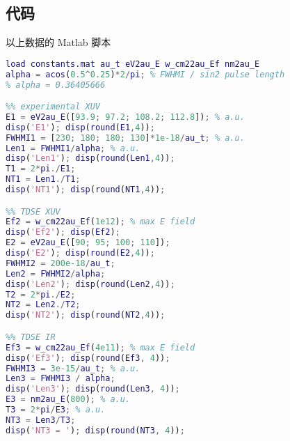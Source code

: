 \subsection{代码}
以上数据的 Matlab 脚本
\begin{lstlisting}[language=matlab]
load constants.mat au_t eV2au_E w_cm22au_Ef nm2au_E
alpha = acos(0.5^0.25)*2/pi; % FWHMI / sin2 pulse length
% alpha = 0.36405666

%% experimental XUV
E1 = eV2au_E([93.9; 97.2; 108.2; 112.8]); % a.u.
disp('E1'); disp(round(E1,4));
FWHMI1 = [230; 180; 180; 130]*1e-18/au_t; % a.u.
Len1 = FWHMI1/alpha; % a.u.
disp('Len1'); disp(round(Len1,4));
T1 = 2*pi./E1;
NT1 = Len1./T1;
disp('NT1'); disp(round(NT1,4));

%% TDSE XUV
Ef2 = w_cm22au_Ef(1e12); % max E field
disp('Ef2'); disp(Ef2);
E2 = eV2au_E([90; 95; 100; 110]);
disp('E2'); disp(round(E2,4));
FWHMI2 = 200e-18/au_t;
Len2 = FWHMI2/alpha;
disp('Len2'); disp(round(Len2,4));
T2 = 2*pi./E2;
NT2 = Len2./T2;
disp('NT2'); disp(round(NT2,4));

%% TDSE IR
Ef3 = w_cm22au_Ef(4e11); % max E field
disp('Ef3'); disp(round(Ef3, 4));
FWHMI3 = 3e-15/au_t; % a.u.
Len3 = FWHMI3 / alpha;
disp('Len3'); disp(round(Len3, 4));
E3 = nm2au_E(800); % a.u.
T3 = 2*pi/E3; % a.u.
NT3 = Len3/T3;
disp('NT3 = '); disp(round(NT3, 4));
\end{lstlisting}

